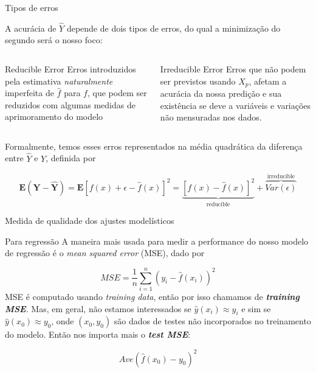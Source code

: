 \documentclass{beamer}
\begin{document}
\begin{frame}{Tipos de erros}

A acurácia de $\hat{Y}$ depende de dois tipos de erros, do qual a minimização do segundo será o nosso foco:

\begin{columns}
    \begin{block}{Reducible Error}
        \small Erros introduzidos pela estimativa \textit{naturalmente} imperfeita de $\hat{f}$ para $f$, que podem ser reduzidos com algumas medidas de aprimoramento do modelo
    \end{block}
    
    \begin{block}{Irreducible Error}
        \small Erros que não podem ser previstos usando $X_p$, afetam a acurácia da nossa predição e sua existência se deve a variáveis e variações não mensuradas nos dados.
    \end{block}
\end{columns}
\vspace{0.05\linewidth}

Formalmente, temos esses erros representados na média quadrática da diferença entre $\hat{Y}$ e $Y$, definida por

\begin{equation}
    \mathbf{E}(\mathbf{Y}- \hat{\mathbf{Y}}) = \mathbf{E}[f(x) + \epsilon - \hat{f}(x)]^2 = 
    \underbrace{[f(x) - \hat{f}(x)]^2}_\text{reducible} + \overbrace{Var(\epsilon)}^{\text{irreducible}}
\end{equation}

\end{frame}

\begin{frame}{Medida de qualidade dos ajustes modelísticos}

\begin{block}{Para regressão}
    A maneira mais usada para medir a performance do nosso modelo de regressão é o  \textit{mean squared error} (MSE), dado por
    
    \begin{equation}
        MSE = \frac{1}{n} \sum_{i=1}^{n} (y_i - \hat{f}(x_i))^2
    \end{equation}
    MSE é computado usando \textit{training data}, então por isso chamamos de \textbf{\textit{training MSE}}. Mas, em geral, não estamos interessados se $\hat{y}(x_i) \approx y_i$ e sim se $\hat{y}(x_0) \approx y_0$, onde $(x_0, y_0)$ são dados de testes não incorporados no treinamento do modelo. Então nos importa mais o \textbf{\textit{test MSE}}:
    
    \begin{equation}
        Ave(\hat{f}(x_0) - y_0)^2
    \end{equation}
 \vfill
 
\end{block}

    
\end{frame}
\end{document}
